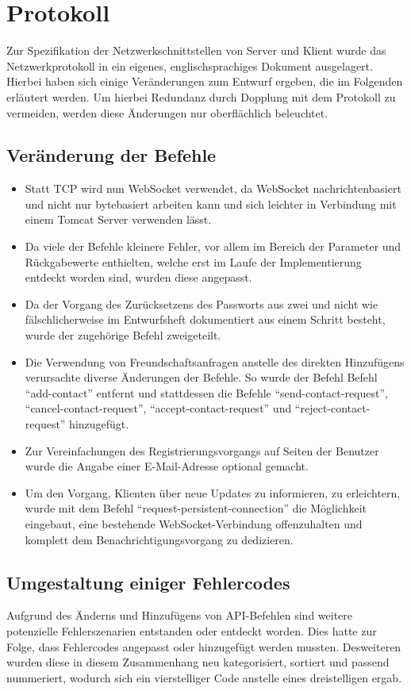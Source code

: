 \documentclass[parskip=full,11pt]{scrartcl}
\begin{document}
\pagebreak
\section{Protokoll}

Zur Spezifikation der Netzwerkschnittstellen von Server und Klient wurde das
Netzwerkprotokoll in ein eigenes, englischsprachiges Dokument ausgelagert.
Hierbei haben sich einige Veränderungen zum Entwurf ergeben,
die im Folgenden erläutert werden.
Um hierbei Redundanz durch Dopplung mit dem Protokoll zu vermeiden,
werden diese Änderungen nur oberflächlich beleuchtet.

\subsection{Veränderung der Befehle}
	\begin{itemize}
		\item Statt TCP wird nun WebSocket verwendet, da WebSocket
			nachrichtenbasiert und nicht nur bytebasiert arbeiten kann und sich
			leichter in Verbindung mit einem Tomcat Server verwenden lässt.
		\item Da viele der Befehle kleinere Fehler, vor allem im Bereich der
			Parameter und Rückgabewerte enthielten, welche erst im Laufe der
			Implementierung entdeckt worden sind, wurden diese angepasst.
		\item Da der Vorgang des Zurücksetzens des Passworts aus zwei und nicht
			wie fälschlicherweise im Entwurfsheft dokumentiert aus einem
			Schritt besteht, wurde der zugehörige Befehl zweigeteilt.
		\item Die Verwendung von Freundschaftsanfragen anstelle des direkten
			Hinzufügens verursachte diverse Änderungen der Befehle.
			So wurde der Befehl Befehl \enquote{add-contact} entfernt und
			stattdessen die Befehle \enquote{send-contact-request},
			\enquote{cancel-contact-request}, \enquote{accept-contact-request}
			und \enquote{reject-contact-request} hinzugefügt.
		\item Zur Vereinfachungen des Registrierungsvorgangs auf Seiten der
			Benutzer wurde die Angabe einer E-Mail-Adresse optional gemacht.
		\item Um den Vorgang, Klienten über neue Updates zu informieren, zu
			erleichtern, wurde mit dem Befehl
			\enquote{request-persistent-connection} die Möglichkeit eingebaut,
			eine bestehende WebSocket-Verbindung offenzuhalten und komplett dem
			Benachrichtigungsvorgang zu dedizieren.
	\end{itemize}

\subsection{Umgestaltung einiger Fehlercodes}
	Aufgrund des Änderns und Hinzufügens von API-Befehlen
	sind weitere potenzielle Fehlerszenarien entstanden oder entdeckt worden.
	Dies hatte zur Folge, dass Fehlercodes angepasst oder hinzugefügt werden
	mussten.
	Desweiteren wurden diese in diesem Zusammenhang neu kategorisiert,
	sortiert und passend nummeriert, wodurch sich ein vierstelliger Code
	anstelle eines dreistelligen ergab.
\end{document}
